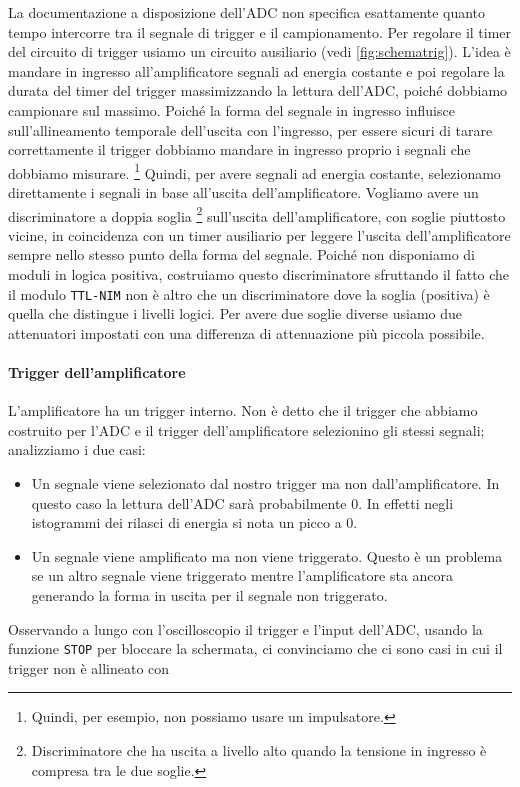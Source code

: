 La documentazione a disposizione dell'ADC non specifica esattamente
quanto tempo intercorre tra il segnale di trigger e il campionamento.
Per regolare il timer del circuito di trigger usiamo un circuito ausiliario
(vedi \autoref{fig:schematrig}).
L'idea è mandare in ingresso all'amplificatore segnali ad energia costante
e poi regolare la durata del timer del trigger massimizzando la lettura dell'ADC,
poiché dobbiamo campionare sul massimo.
Poiché la forma del segnale in ingresso influisce sull'allineamento temporale
dell'uscita con l'ingresso,
per essere sicuri di tarare correttamente il trigger
dobbiamo mandare in ingresso proprio i segnali che dobbiamo misurare.%
\footnote{Quindi, per esempio, non possiamo usare un impulsatore.}
Quindi, per avere segnali ad energia costante,
selezionamo direttamente i segnali in base all'uscita dell'amplificatore.
Vogliamo avere un discriminatore a doppia soglia%
\footnote{Discriminatore che ha uscita a livello alto quando la tensione in ingresso è compresa tra le due soglie.}
sull'uscita dell'amplificatore, con soglie piuttosto vicine,
in coincidenza con un timer ausiliario per leggere l'uscita dell'amplificatore
sempre nello stesso punto della forma del segnale.
Poiché non disponiamo di moduli in logica positiva,
costruiamo questo discriminatore sfruttando il fatto che il modulo \texttt{TTL-NIM}
non è altro che un discriminatore dove la soglia (positiva) è quella che distingue i livelli logici.
Per avere due soglie diverse
usiamo due attenuatori impostati con una differenza di attenuazione più piccola possibile.

\paragraph{Trigger dell'amplificatore}

L'amplificatore ha un trigger interno.
Non è detto che il trigger che abbiamo costruito per l'ADC e il trigger dell'amplificatore
selezionino gli stessi segnali; analizziamo i due casi:
\begin{itemize}
	\item Un segnale viene selezionato dal nostro trigger ma non dall'amplificatore.
	In questo caso la lettura dell'ADC sarà probabilmente 0.
	In effetti negli istogrammi dei rilasci di energia si nota un picco a 0.
	\item Un segnale viene amplificato ma non viene triggerato.
	Questo è un problema se un altro segnale viene triggerato
	mentre l'amplificatore sta ancora generando la forma in uscita per il segnale non triggerato.
\end{itemize}
Osservando a lungo con l'oscilloscopio il trigger e l'input dell'ADC,
usando la funzione \texttt{STOP} per bloccare la schermata,
ci convinciamo che ci sono casi in cui il trigger non è allineato con
